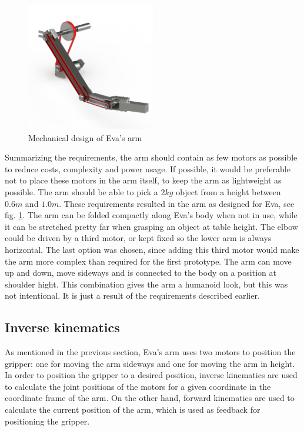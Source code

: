 \documentclass[project_eva.tex]{subfiles}
\begin{document}
\begin{figure}[h]
	\centering
	\mbox{\includegraphics[width=0.5\textwidth]{Images/armMechOverview.png}}
	\caption{Mechanical design of Eva's arm}
	\label{fig:armMechOverview}
\end{figure}

Summarizing the requirements, the arm should contain as few motors as possible to reduce costs, complexity and power usage. If possible, it would be preferable not to place these motors in the arm itself, to keep the arm as lightweight as possible. The arm should be able to pick a $2kg$ object from a height between $0.6m$ and $1.0m$. These requirements resulted in the arm as designed for Eva, see fig. \ref{fig:armMechOverview}.
The arm can be folded compactly along Eva’s body when not in use, while it can be stretched pretty far when grasping an object at table height. The elbow could be driven by a third motor, or kept fixed so the lower arm is always horizontal. The last option was chosen, since adding this third motor would make the arm more complex than required for the first prototype. The arm can move up and down, move sideways and is connected to the body on a position at shoulder hight. This combination gives the arm a humanoid look, but this was not intentional. It is just a result of the requirements described earlier.

\subsection*{Inverse kinematics}
As mentioned in the previous section, Eva's arm uses two motors to position the gripper: one for moving the arm sideways 
and one for moving the arm in height. In order to position the gripper to a desired position, inverse kinematics are used 
to calculate the joint positions of the motors for a given coordinate in the coordinate frame of the arm. On the other 
hand, forward kinematics are used to calculate the current position of the arm, which is used as feedback for positioning 
the gripper. 
\end{document}
